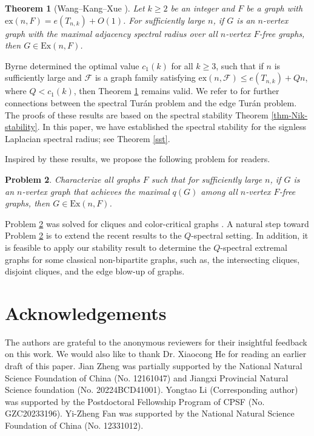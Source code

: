 \documentclass[11pt,a4paper]{article}
\theoremstyle{plain}
\newtheorem{theorem}{Theorem}[section]
\newtheorem{problem}[theorem]{Problem}
\theoremstyle{definition}
\begin{document}
\begin{theorem}[Wang--Kang--Xue \cite{Wang2022}] \label{thm-WKX}
Let $k\ge 2$ be an integer and $F$ be a graph with $\mathrm{ex}(n,F)= e(T_{n,k}) + O(1)$. For sufficiently large $n$, if $G$ is an $n$-vertex graph with the maximal adjacency spectral radius
over all $n$-vertex $F$-free graphs, then
$ G\in \mathrm{Ex}(n,F)$. 
\end{theorem}

{Byrne \cite{Byr2026} determined the optimal value $c_1(k)$ for all $k\ge 3$, such that if $n$ is sufficiently large and $\mathcal{F}$ is a graph family satisfying $\mathrm{ex}(n,\mathcal{F}) \le e(T_{n,k}) + Qn $, where $Q < c_1(k)$, then Theorem \ref{thm-WKX} remains valid. 
 We refer to \cite{FLZ2025,FTZ2024} for further connections between the spectral Tur\'{a}n problem and the edge Tur\'{a}n problem.}    
 The proofs of these results are based on the spectral stability Theorem \ref{thm-Nik-stability}. 
 In this paper, we have established the spectral stability for the signless Laplacian spectral radius; see Theorem \ref{sst}. 
{Inspired by these results, we propose the following problem for readers. 



\begin{problem} \label{conj-9-4}
   Characterize all graphs $F$ such that for sufficiently large $n$, 
    if $G$ is an $n$-vertex graph that achieves the maximal $q(G)$ among all $n$-vertex ${F}$-free graphs, then 
    $G\in \mathrm{Ex}(n,{F})$. 
\end{problem}
 } 

Problem \ref{conj-9-4} was solved for cliques \cite{HJZ2013} and color-critical graphs  \cite{ZLL2025}. {A natural step toward Problem \ref{conj-9-4} is to extend the recent results \cite{Wang2022,FLZ2025,Byr2026} to the $Q$-spectral setting.} 
In addition, it is feasible to apply our stability result to determine the $Q$-spectral extremal graphs for some classical non-bipartite graphs, such as, the intersecting cliques, disjoint cliques, and the edge blow-up of graphs. 


\section*{Acknowledgements}
The authors are grateful to the anonymous reviewers for their insightful feedback on this work.
We would also like to thank Dr. Xiaocong He for reading an earlier draft of this paper. 
Jian Zheng was partially supported by the National Natural Science Foundation of China (No. 12161047) and Jiangxi Provincial Natural Science foundation (No. 20224BCD41001). 
Yongtao Li (Corresponding author) was supported by the Postdoctoral Fellowship Program of CPSF (No. GZC20233196). Yi-Zheng Fan was 
supported by the National Natural Science Foundation of China (No. 12331012). 
\end{document}

